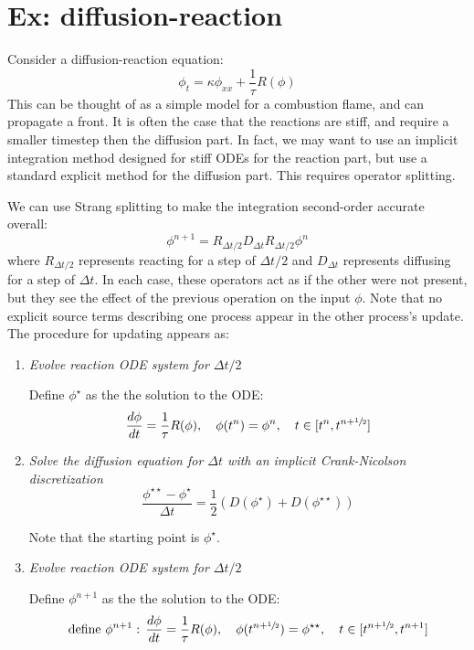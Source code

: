\section{Ex: diffusion-reaction}
\label{sec:multiphys:diffreact}

Consider a diffusion-reaction equation:
\begin{equation}
\phi_t = \kappa \phi_{xx} + \frac{1}{\tau} R(\phi)
\end{equation}
This can be thought of as a simple model for a combustion flame, and
can propagate a front.  It is often the case that the reactions are
stiff, and require a smaller timestep then the diffusion part.  In
fact, we may want to use an implicit integration method designed for
stiff ODEs for the reaction part, but use a standard explicit method
for the diffusion part.  This requires operator splitting.

We can use Strang splitting \cite{strang} to make the integration
second-order accurate overall:
\begin{equation}
\phi^{n+1} = R_{\Delta t/2} D_{\Delta t} R_{\Delta t/2} \phi^n
\end{equation}
where $R_{\Delta t/2}$ represents reacting for a step of $\Delta t/2$
and $D_{\Delta t}$ represents diffusing for a step of $\Delta t$.  In
each case, these operators act as if the other were not present, but
they see the effect of the previous operation on the input $\phi$.
Note that no explicit source terms describing one process appear in the other
process's update.  The procedure for updating appears as:
\begin{enumerate}
\item {\em Evolve reaction ODE system for $\Delta t/2$}

  Define $\phi^\star$ as the the solution to the ODE:
   \begin{equation}
     \frac{d\phi}{dt} = \frac{1}{\tau} R(\phi), \quad
   \phi(t^n) = \phi^n, \quad t \in [t^n, t^{n+{\sfrac{1}{2}}}]
   \end{equation}

\item {\em Solve the diffusion equation for $\Delta t$ with an
           implicit Crank-Nicolson discretization}
   \begin{equation}
     \frac{\phi^{\star\star} - \phi^\star}{\Delta t} =
      \frac{1}{2} (D(\phi^\star) + D(\phi^{\star\star}))
   \end{equation}

   Note that the starting point is $\phi^\star$.

\item {\em Evolve reaction ODE system for $\Delta t/2$}

  Define $\phi^{n+1}$ as the the solution to the ODE:
   \begin{equation}
     \text{define } \phi^{n+1}: \, \frac{d\phi}{dt} = \frac{1}{\tau} R(\phi), \quad
   \phi(t^{n+{\sfrac{1}{2}}}) = \phi^{\star\star}, \quad t \in [t^{n+{\sfrac{1}{2}}}, t^{n+1}]
   \end{equation}

\end{enumerate}

